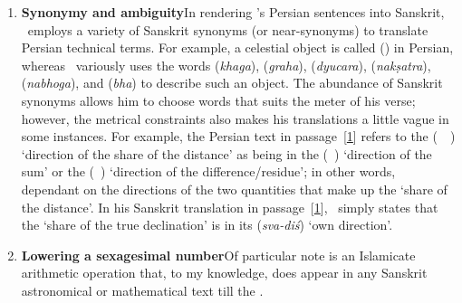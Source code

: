\begin{enumerate}[topsep=0pt]
    \item \textbf{Synonymy and ambiguity}\quad In rendering \MullaFarid's Persian sentences into Sanskrit, \Nityananda\ employs a variety of Sanskrit synonyms (or near-synonyms) to translate Persian technical terms. For example, a celestial object is called  (\kawkab) in Persian, whereas \Nityananda\ variously uses the words   (\textit{khaga}),  (\textit{graha}),   (\textit{dyucara}),  (\textit{nakṣatra}),  (\textit{nabhoga}), and  (\textit{bha}) to describe such an object. The abundance of Sanskrit synonyms allows him to choose words that suits the meter of his verse; however, the metrical constraints also makes his translations a little vague in some instances. For example, the Persian text in passage~[\hyperlink{PEpass1}{1}] refers to the  (\jahat\idafaconsonant\ \hissi\idafavowel\ \bud) `direction of the share of the distance' as being in the   (\jahat\idafaconsonant\ \majmu) `direction of the sum' or the  (\jahat\idafaconsonant\ \fadla) `direction of the difference/residue'; in other words, dependant on the directions of the two quantities that make up the `share of the distance'. In his 
    Sanskrit translation in passage~[\hyperlink{SEpass1}{1}], \Nityananda\ simply states that the `share of the true declination' is in its  (\textit{sva-diś}) `own direction'.
    
    \item \textbf{Lowering a sexagesimal number}\quad Of particular note is an Islamicate arithmetic operation that, to my knowledge, does appear in any Sanskrit astronomical or mathematical text till the \Siddhantasindhu.  
    

\end{enumerate}
